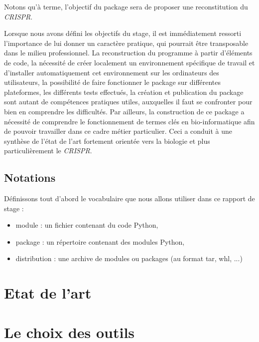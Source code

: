\documentclass[twoside,a4paper,11pt,frenchb,openany]{report}
\begin{document}
Notons qu'à terme, l'objectif du package sera de proposer une reconstitution du \textit{CRISPR}.

Lorsque nous avons défini les objectifs du stage, il est immédiatement ressorti l'importance de lui donner un caractère pratique, qui pourrait être transposable dans le milieu professionnel. La reconstruction du programme à partir d'éléments de code, la nécessité de créer localement un environnement spécifique de travail et d'installer automatiquement cet environnement sur les ordinateurs des utilisateurs, la possibilité de faire fonctionner le package sur différentes plateformes, les différents tests effectués, la création et publication du package sont autant de compétences pratiques utiles, auxquelles il faut se confronter pour bien en comprendre les difficultés. Par ailleurs, la construction de ce package a nécessité de comprendre le fonctionnement de termes clés en bio-informatique afin de pouvoir travailler dans ce cadre métier particulier. Ceci a conduit à une synthèse de l'état de l'art fortement orientée vers la biologie et plus particulièrement le \textit{CRISPR}.



\section{Notations}

Définissons tout d'abord le vocabulaire que nous allons utiliser dans ce rapport de stage :
\begin{itemize}
\item module : un fichier contenant du code Python,
\item package : un répertoire contenant des modules Python,
\item distribution : une archive de modules ou packages (au format tar, whl, ...)
\end{itemize}



\chapter{Etat de l'art}


	

\chapter{Le choix des outils}
\end{document}
